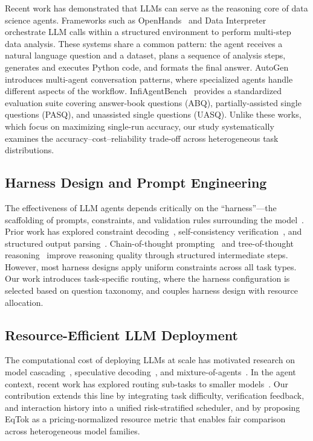 \documentclass[letterpaper]{article} %
\begin{document}
Recent work has demonstrated that LLMs can serve as the reasoning core of data science agents. Frameworks such as OpenHands~\cite{wang2024data} and Data Interpreter~\cite{guo2024data} orchestrate LLM calls within a structured environment to perform multi-step data analysis. These systems share a common pattern: the agent receives a natural language question and a dataset, plans a sequence of analysis steps, generates and executes Python code, and formats the final answer. AutoGen~\cite{wu2023autogen} introduces multi-agent conversation patterns, where specialized agents handle different aspects of the workflow. InfiAgentBench~\cite{infiagentbench} provides a standardized evaluation suite covering answer-book questions (ABQ), partially-assisted single questions (PASQ), and unassisted single questions (UASQ). Unlike these works, which focus on maximizing single-run accuracy, our study systematically examines the accuracy--cost--reliability trade-off across heterogeneous task distributions.

\subsection{Harness Design and Prompt Engineering}

The effectiveness of LLM agents depends critically on the ``harness''---the scaffolding of prompts, constraints, and validation rules surrounding the model~\cite{white2023prompt}. Prior work has explored constraint decoding~\cite{lu2024chameleon}, self-consistency verification~\cite{wang2022self}, and structured output parsing~\cite{zheng2023judgelm}. Chain-of-thought prompting~\cite{wei2022chain} and tree-of-thought reasoning~\cite{yao2023tree} improve reasoning quality through structured intermediate steps. However, most harness designs apply uniform constraints across all task types. Our work introduces task-specific routing, where the harness configuration is selected based on question taxonomy, and couples harness design with resource allocation.

\subsection{Resource-Efficient LLM Deployment}

The computational cost of deploying LLMs at scale has motivated research on model cascading~\cite{varshney2022model}, speculative decoding~\cite{leviathan2023fast}, and mixture-of-agents~\cite{wang2024mixture}. In the agent context, recent work has explored routing sub-tasks to smaller models~\cite{chen2024fusellm, ong2024route}. Our contribution extends this line by integrating task difficulty, verification feedback, and interaction history into a unified risk-stratified scheduler, and by proposing EqTok as a pricing-normalized resource metric that enables fair comparison across heterogeneous model families.
\end{document}

